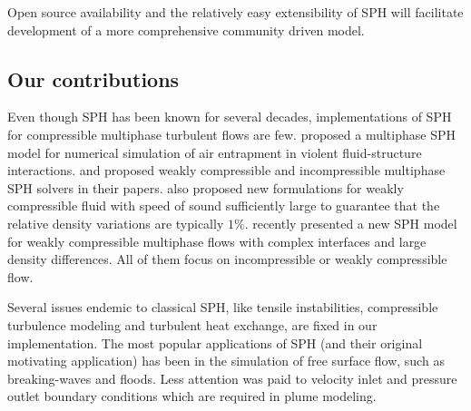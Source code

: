 \documentclass[gmd, manuscript]{copernicus}
\begin{document}
Open source availability and the relatively easy extensibility of SPH will facilitate development of a more comprehensive community driven model.

\subsection{Our contributions}
Even though SPH has been known for several decades, implementations of SPH for compressible multiphase turbulent flows are few. \citet{colagrossi2003numerical} proposed a multiphase SPH model for numerical simulation of air entrapment in violent fluid-structure interactions. \citet{hu2007incompressible} and \citet{adami2010new} proposed weakly compressible and incompressible multiphase SPH solvers in their papers. \citet{monaghan2013simple} also proposed new formulations for weakly compressible fluid with speed of sound sufficiently large to guarantee that the relative density variations are typically $1\%$. \citet {chen2015sph} recently presented a new SPH model for weakly compressible multiphase flows with complex interfaces and large density differences. All of them focus on incompressible or weakly compressible flow.

Several issues endemic to classical SPH, like tensile instabilities,  compressible turbulence modeling and turbulent heat exchange, are fixed in our implementation. The most popular applications of SPH (and their original motivating application) has been in the simulation of free surface flow, such as breaking-waves and floods. Less attention was paid to velocity inlet and pressure outlet boundary conditions which are required in plume modeling.
 
\end{document}
